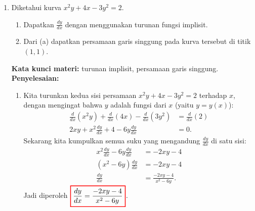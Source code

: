 \documentclass[10pt,openany,a4paper]{article}
\theoremstyle{definition}
\theoremstyle{definition}
\theoremstyle{plain}
\newenvironment{jawab}[2][tes]{
\textbf{Kata kunci materi:} #1.\\
\textbf{Penyelesaian:} #2
}{}
\begin{document}
\begin{enumerate}
\begin{jawab}[limit fungsi, sketsa grafik]
{\begin{enumerate}
                \end{enumerate}
            }
                
            \end{jawab}
            \item Diketahui kurva $x^2y+4x-3y^2=2$.
            \begin{enumerate}
                \item Dapatkan $\frac{dy}{dx}$ dengan menggunakan turunan fungsi implisit.
                \item Dari (a) dapatkan persamaan garis singgung pada kurva tersebut di titik $(1,1)$.
            \end{enumerate}
            \begin{jawab}[turunan implisit, persamaan garis singgung]{
                \begin{enumerate}
                    \item Kita turunkan kedua sisi persamaan $x^2y+4x-3y^2=2$ terhadap $x$, dengan mengingat bahwa $y$ adalah fungsi dari $x$ (yaitu $y=y(x)$):
                    \begin{align*}
                        \frac{d}{dx}(x^2y) + \frac{d}{dx}(4x) - \frac{d}{dx}(3y^2) &= \frac{d}{dx}(2)\\
                        2xy + x^2\frac{dy}{dx} + 4 - 6y\frac{dy}{dx} &= 0.
                    \end{align*}
                    Sekarang kita kumpulkan semua suku yang mengandung $\frac{dy}{dx}$ di satu sisi:
                    \begin{align*}
                        x^2\frac{dy}{dx} - 6y\frac{dy}{dx} &= -2xy - 4\\
                        (x^2 - 6y)\frac{dy}{dx} &= -2xy - 4\\
                        \frac{dy}{dx} &= \frac{-2xy - 4}{x^2 - 6y}.
                    \end{align*}
                    Jadi diperoleh $\colorlet{oldcolor}{.}
        \color{red}
        \setlength{\fboxrule}{1pt} \boxed{\color{oldcolor}\frac{dy}{dx} = \frac{-2xy - 4}{x^2 - 6y}}\color{oldcolor}$.

\end{enumerate}}
\end{jawab}
\end{enumerate}
\end{document}
